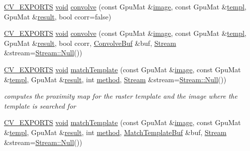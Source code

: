 \begin{DoxyCompactItemize}
\item 
\hyperlink{core_2types__c_8h_a1bf9f0e121b54272da02379cfccd0a2b}{C\-V\-\_\-\-E\-X\-P\-O\-R\-T\-S} \hyperlink{legacy_8hpp_a8bb47f092d473522721002c86c13b94e}{void} \hyperlink{namespacecv_1_1gpu_acedc0610e0ef2aa3673d43c4d8ff6058}{convolve} (const Gpu\-Mat \&\hyperlink{legacy_8hpp_ad62b16ab219ae2483e8a3d921c44cc97}{image}, const Gpu\-Mat \&\hyperlink{imgproc__c_8h_a3dda0ce9b269462404396ce3e9eedf00}{templ}, Gpu\-Mat \&\hyperlink{legacy_8hpp_a0bb77d54f6769867cfdf389897bd8e43}{result}, bool ccorr=false)
\item 
\hyperlink{core_2types__c_8h_a1bf9f0e121b54272da02379cfccd0a2b}{C\-V\-\_\-\-E\-X\-P\-O\-R\-T\-S} \hyperlink{legacy_8hpp_a8bb47f092d473522721002c86c13b94e}{void} \hyperlink{namespacecv_1_1gpu_a3555c18cfb02c0d0e78c8fd2095448c5}{convolve} (const Gpu\-Mat \&\hyperlink{legacy_8hpp_ad62b16ab219ae2483e8a3d921c44cc97}{image}, const Gpu\-Mat \&\hyperlink{imgproc__c_8h_a3dda0ce9b269462404396ce3e9eedf00}{templ}, Gpu\-Mat \&\hyperlink{legacy_8hpp_a0bb77d54f6769867cfdf389897bd8e43}{result}, bool ccorr, \hyperlink{structcv_1_1gpu_1_1ConvolveBuf}{Convolve\-Buf} \&buf, \hyperlink{classcv_1_1gpu_1_1Stream}{Stream} \&stream=\hyperlink{classcv_1_1gpu_1_1Stream_af96c23564834f88333dcb8997df553f1}{Stream\-::\-Null}())
\item 
\hyperlink{core_2types__c_8h_a1bf9f0e121b54272da02379cfccd0a2b}{C\-V\-\_\-\-E\-X\-P\-O\-R\-T\-S} \hyperlink{legacy_8hpp_a8bb47f092d473522721002c86c13b94e}{void} \hyperlink{namespacecv_1_1gpu_aaee18beb5678a4bdf95eb3082aabd92a}{match\-Template} (const Gpu\-Mat \&\hyperlink{legacy_8hpp_ad62b16ab219ae2483e8a3d921c44cc97}{image}, const Gpu\-Mat \&\hyperlink{imgproc__c_8h_a3dda0ce9b269462404396ce3e9eedf00}{templ}, Gpu\-Mat \&\hyperlink{legacy_8hpp_a0bb77d54f6769867cfdf389897bd8e43}{result}, int \hyperlink{legacy_8hpp_adc6d8f8df4f2d0df2ece83c432e2681f}{method}, \hyperlink{classcv_1_1gpu_1_1Stream}{Stream} \&stream=\hyperlink{classcv_1_1gpu_1_1Stream_af96c23564834f88333dcb8997df553f1}{Stream\-::\-Null}())
\begin{DoxyCompactList}\small\item\em computes the proximity map for the raster template and the image where the template is searched for \end{DoxyCompactList}\item 
\hyperlink{core_2types__c_8h_a1bf9f0e121b54272da02379cfccd0a2b}{C\-V\-\_\-\-E\-X\-P\-O\-R\-T\-S} \hyperlink{legacy_8hpp_a8bb47f092d473522721002c86c13b94e}{void} \hyperlink{namespacecv_1_1gpu_a8ff232fea79c4741b66d3629dfc82787}{match\-Template} (const Gpu\-Mat \&\hyperlink{legacy_8hpp_ad62b16ab219ae2483e8a3d921c44cc97}{image}, const Gpu\-Mat \&\hyperlink{imgproc__c_8h_a3dda0ce9b269462404396ce3e9eedf00}{templ}, Gpu\-Mat \&\hyperlink{legacy_8hpp_a0bb77d54f6769867cfdf389897bd8e43}{result}, int \hyperlink{legacy_8hpp_adc6d8f8df4f2d0df2ece83c432e2681f}{method}, \hyperlink{structcv_1_1gpu_1_1MatchTemplateBuf}{Match\-Template\-Buf} \&buf, \hyperlink{classcv_1_1gpu_1_1Stream}{Stream} \&stream=\hyperlink{classcv_1_1gpu_1_1Stream_af96c23564834f88333dcb8997df553f1}{Stream\-::\-Null}())

\end{DoxyCompactItemize}
